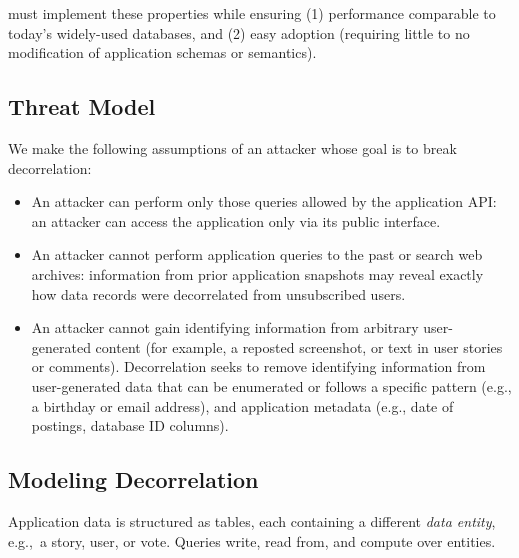 \sys{} must implement these properties while ensuring (1) performance comparable to today’s
widely-used databases, and (2) easy adoption (requiring little to no modification of application
schemas or semantics).

\subsection{Threat Model} 
We make the following assumptions of an attacker whose goal is to break decorrelation:
\begin{itemize}
    \item An attacker can perform only those queries allowed by the application API: an
attacker can access the application only via its public interface. 

    \item An attacker cannot perform application queries to the past or search web archives:
    information from prior application snapshots may reveal 
    exactly how data records were decorrelated from unsubscribed users. 

    \item An attacker cannot gain identifying information from arbitrary user-generated content (for
        example, a reposted screenshot, or text in user stories or comments). Decorrelation seeks to
        remove identifying information from user-generated data that can be enumerated or follows a
        specific pattern (e.g., a birthday or email address), and application metadata (e.g., date
        of postings, database ID columns).
\end{itemize}

\subsection{Modeling Decorrelation}
Application data is structured as tables, each containing a different \emph{data entity}, e.g.,\ a
story, user, or vote.  
Queries write, read
from, and compute over entities. 


